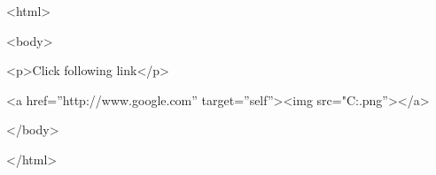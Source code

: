 <html>

<body>

<p>Click following link</p>

<a href=”http://www.google.com” target=”self”><img src="C:\Users\ganes\Downloads\google.png”></a>



</body>

</html>